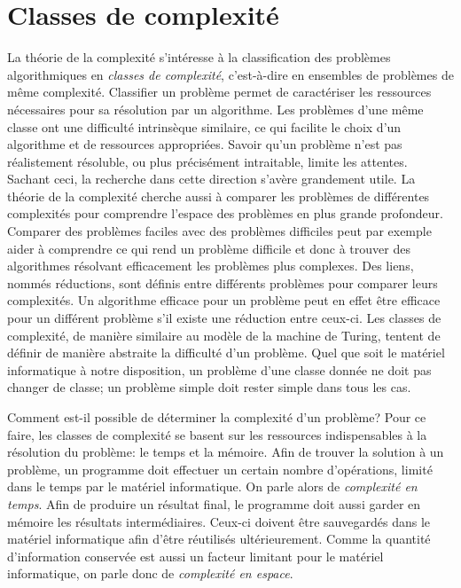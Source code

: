 
\section{Classes de complexité}
\label{sec:classes-de-complexite}

La théorie de la complexité s'intéresse à la classification des problèmes algorithmiques en \textit{classes de complexité}, c'est-à-dire en ensembles de problèmes de même complexité. Classifier un problème permet de caractériser les ressources nécessaires pour sa résolution par un algorithme. Les problèmes d'une même classe ont une difficulté intrinsèque similaire, ce qui facilite le choix d'un algorithme et de ressources appropriées. Savoir qu'un problème n'est pas réalistement résoluble, ou plus précisément intraitable, limite les attentes. Sachant ceci, la recherche dans cette direction s'avère grandement utile. La théorie de la complexité cherche aussi à comparer les problèmes de différentes complexités pour comprendre l'espace des problèmes en plus grande profondeur. Comparer des problèmes faciles avec des problèmes difficiles peut par exemple aider à comprendre ce qui rend un problème difficile et donc à trouver des algorithmes résolvant efficacement les problèmes plus complexes. Des liens, nommés réductions, sont définis entre différents problèmes pour comparer leurs complexités. Un algorithme efficace pour un problème peut en effet être efficace pour un différent problème s'il existe une réduction entre ceux-ci. Les classes de complexité, de manière similaire au modèle de la machine de Turing, tentent de définir de manière abstraite la difficulté d'un problème. Quel que soit le matériel informatique à notre disposition, un problème d'une classe donnée ne doit pas changer de classe; un problème simple doit rester simple dans tous les cas.

Comment est-il possible de déterminer la complexité d'un problème? Pour ce faire, les classes de complexité se basent sur les ressources indispensables à la résolution du problème: le temps et la mémoire. Afin de trouver la solution à un problème, un programme doit effectuer un certain nombre d'opérations, limité dans le temps par le matériel informatique. On parle alors de \textit{complexité en temps}. Afin de produire un résultat final, le programme doit aussi garder en mémoire les résultats intermédiaires. Ceux-ci doivent être sauvegardés dans le matériel informatique afin d'être réutilisés ultérieurement. Comme la quantité d'information conservée est aussi un facteur limitant pour le matériel informatique, on parle donc de \textit{complexité en espace}. 

